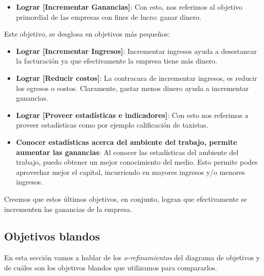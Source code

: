 \documentclass[a4paper, 10pt, twoside]{article}
\begin{document}
\begin{itemize}

\item \textbf{Lograr [Incrementar Ganancias]}: Con esto, nos referimos al objetivo primordial de las empresas con fines de lucro: ganar dinero.
\end{itemize}
Este objetivo, se desglosa en objetivos más pequeños:
\begin{itemize}

\item \textbf{Lograr [Incrementar Ingresos]}: Incrementar ingresos ayuda a desestancar la facturación ya que efectivamente la empresa tiene más dinero.

\item \textbf{Lograr [Reducir costos]}: La contracara de incrementar ingresos, es reducir los egresos o costos. Claramente, gastar menos dinero ayuda a incrementar ganancias.

\item \textbf{Lograr [Proveer estadísticas e indicadores]}: Con esto nos referimos a proveer estadísticas como por ejemplo calificación de taxistas.

\item \textbf{Conocer estadísticas acerca del ambiente del trabajo, permite aumentar las ganancias}: Al conocer las estadísticas del ambiente del trabajo, puedo obtener un mejor conocimiento del medio. Esto permite podes aprovechar mejor el capital, incurriendo en mayores ingresos y/o menores ingresos.

\end{itemize}

Creemos que estos últimos objetivos, en conjunto, logran que efectivamente se incrementen las ganancias de la empresa.

\subsection{Objetivos blandos}

En esta sección vamos a hablar de los \emph{o-refinamientos} del diagrama de objetivos y de cuáles son los objetivos blandos que utilizamos para compararlos.
\end{document}
